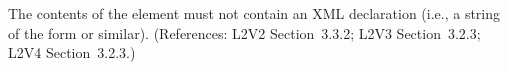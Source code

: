 The contents of the  element must not contain an XML
declaration (i.e., a string of the form  or similar).  (References: L2V2 Section~3.3.2;
L2V3 Section~3.2.3; L2V4 Section~3.2.3.)
